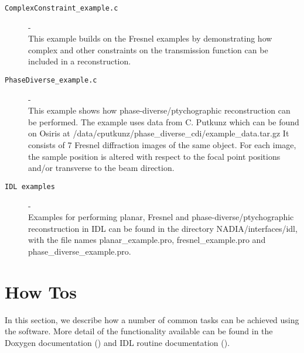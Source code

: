\documentclass[]{nadia}
\begin{document}
\begin{description}
\item[{\tt ComplexConstraint\_example.c }]- \\ This example builds on
  the Fresnel examples by demonstrating how complex and other
  constraints on the transmission function can be included in a
  reconstruction.

\item[{\tt PhaseDiverse\_example.c }]- \\ This example shows how
  phase-diverse/ptychographic reconstruction can be performed. The
  example uses data from C. Putkunz which can be found on Osiris at
  /data/cputkunz/phase\_diverse\_cdi/example\_data.tar.gz It consists
  of 7 Fresnel diffraction images of the same object.  For each image,
  the sample position is altered with respect to the focal point
  positions and/or transverse to the beam direction.

\item[{\tt IDL examples}] - \\ Examples for performing planar, Fresnel
  and phase-diverse/ptychographic reconstruction in IDL can be found
  in the directory NADIA/interfaces/idl, with the file names
  planar\_example.pro, fresnel\_example.pro and
  phase\_diverse\_example.pro.

\end{description}


\newpage

\section{How Tos}
\label{how to}

In this section, we describe how a number of common tasks can be
achieved using the software. More detail of the functionality
available can be found in the Doxygen documentation () and IDL routine
documentation (). 
\end{document}
